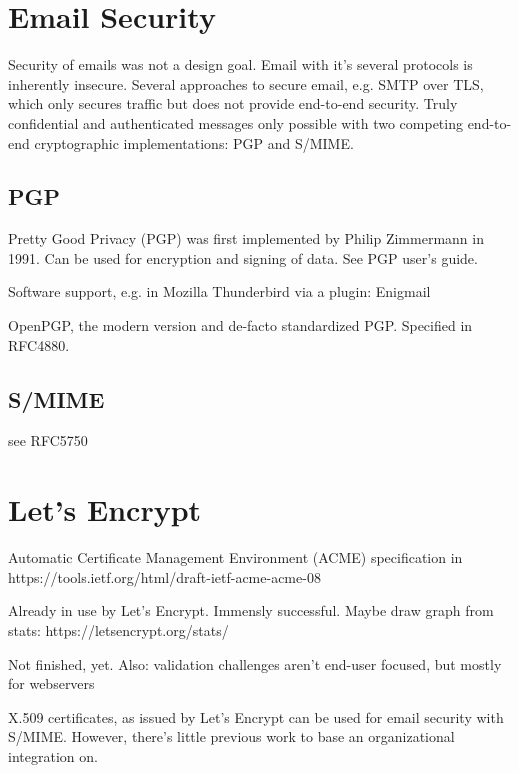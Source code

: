 \section{Email Security}\label{sec:emailSecurity}

Security of emails was not a design goal.
Email with it's several protocols is inherently insecure.
Several approaches to secure email, e.g. SMTP over TLS, which only secures traffic but does not provide end-to-end
security.
Truly confidential and authenticated messages only possible with two competing end-to-end cryptographic implementations:
PGP and S/MIME.

\subsection{PGP}\label{subsec:pgp}

Pretty Good Privacy (PGP) was first implemented by Philip Zimmermann in 1991.
Can be used for encryption and signing of data.
See PGP user's guide.

Software support, e.g. in Mozilla Thunderbird via a plugin: Enigmail

OpenPGP, the modern version and de-facto standardized PGP.
Specified in RFC4880.

\subsection{S/MIME}\label{subsec:s/mime}
see RFC5750

\section{Let's Encrypt}\label{sec:letsEncrypt}

Automatic Certificate Management Environment (ACME) specification in https://tools.ietf.org/html/draft-ietf-acme-acme-08

Already in use by Let's Encrypt. Immensly successful. Maybe draw graph from stats: https://letsencrypt.org/stats/

Not finished, yet. Also: validation challenges aren't end-user focused, but mostly for webservers

X.509 certificates, as issued by Let's Encrypt can be used for email security with S/MIME. However, there's little
previous work to base an organizational integration on.

